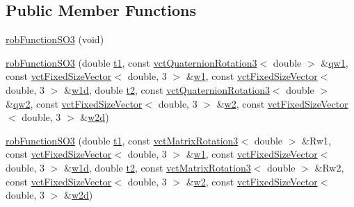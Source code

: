\subsection*{Public Member Functions}
\begin{DoxyCompactItemize}
\item 
\hyperlink{classrob_function_s_o3_a6d476ee22de0a51149e2866cd51e00bb}{rob\+Function\+S\+O3} (void)
\item 
\hyperlink{classrob_function_s_o3_a2133170b0f0a410790da1200479b3932}{rob\+Function\+S\+O3} (double \hyperlink{classrob_function_a9a4b408a3a5a8ae927caec3b6bac36ef}{t1}, const \hyperlink{classvct_quaternion_rotation3}{vct\+Quaternion\+Rotation3}$<$ double $>$ \&\hyperlink{classrob_function_s_o3_ab39d2e94ec47a7218e8e42209243c628}{qw1}, const \hyperlink{classvct_fixed_size_vector}{vct\+Fixed\+Size\+Vector}$<$ double, 3 $>$ \&\hyperlink{classrob_function_s_o3_a458bc7e9276f38ec681ad5e3a733e73e}{w1}, const \hyperlink{classvct_fixed_size_vector}{vct\+Fixed\+Size\+Vector}$<$ double, 3 $>$ \&\hyperlink{classrob_function_s_o3_ae01c6c68ea9ed10bf462d7103cf3ed7d}{w1d}, double \hyperlink{classrob_function_abf15c2d695ab4cc6336e19862327858f}{t2}, const \hyperlink{classvct_quaternion_rotation3}{vct\+Quaternion\+Rotation3}$<$ double $>$ \&\hyperlink{classrob_function_s_o3_ae8f7673ef36c4dcf8af771af852b974d}{qw2}, const \hyperlink{classvct_fixed_size_vector}{vct\+Fixed\+Size\+Vector}$<$ double, 3 $>$ \&\hyperlink{classrob_function_s_o3_af26136555c376caff1bb1e84f1b3b3f1}{w2}, const \hyperlink{classvct_fixed_size_vector}{vct\+Fixed\+Size\+Vector}$<$ double, 3 $>$ \&\hyperlink{classrob_function_s_o3_a888acaf14bf3ff075b5a13e811e52ab0}{w2d})
\item 
\hyperlink{classrob_function_s_o3_a94f8457a7c91ba2f12d193cd26981982}{rob\+Function\+S\+O3} (double \hyperlink{classrob_function_a9a4b408a3a5a8ae927caec3b6bac36ef}{t1}, const \hyperlink{classvct_matrix_rotation3}{vct\+Matrix\+Rotation3}$<$ double $>$ \&Rw1, const \hyperlink{classvct_fixed_size_vector}{vct\+Fixed\+Size\+Vector}$<$ double, 3 $>$ \&\hyperlink{classrob_function_s_o3_a458bc7e9276f38ec681ad5e3a733e73e}{w1}, const \hyperlink{classvct_fixed_size_vector}{vct\+Fixed\+Size\+Vector}$<$ double, 3 $>$ \&\hyperlink{classrob_function_s_o3_ae01c6c68ea9ed10bf462d7103cf3ed7d}{w1d}, double \hyperlink{classrob_function_abf15c2d695ab4cc6336e19862327858f}{t2}, const \hyperlink{classvct_matrix_rotation3}{vct\+Matrix\+Rotation3}$<$ double $>$ \&Rw2, const \hyperlink{classvct_fixed_size_vector}{vct\+Fixed\+Size\+Vector}$<$ double, 3 $>$ \&\hyperlink{classrob_function_s_o3_af26136555c376caff1bb1e84f1b3b3f1}{w2}, const \hyperlink{classvct_fixed_size_vector}{vct\+Fixed\+Size\+Vector}$<$ double, 3 $>$ \&\hyperlink{classrob_function_s_o3_a888acaf14bf3ff075b5a13e811e52ab0}{w2d})

\end{DoxyCompactItemize}
